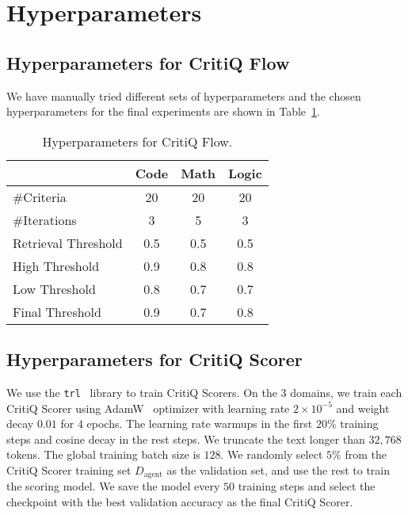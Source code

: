 \section{Hyperparameters}
\label{sec:hyperparameter}

\subsection{Hyperparameters for CritiQ Flow}

We have manually tried different sets of hyperparameters and the chosen
hyperparameters for the final experiments are shown in Table~\ref{tab:hyperparameter}.

\begin{table}[htbp]
    \centering
    \begin{tabular}{lccc}
        \toprule            & \textbf{Code} & \textbf{Math} & \textbf{Logic} \\
        \midrule \#Criteria & 20            & 20            & 20             \\
        \#Iterations        & 3             & 5             & 3              \\
        Retrieval Threshold & 0.5           & 0.5           & 0.5            \\
        High Threshold      & 0.9           & 0.8           & 0.8            \\
        Low Threshold       & 0.8           & 0.7           & 0.7            \\
        Final Threshold     & 0.9           & 0.7           & 0.8            \\
        \bottomrule
    \end{tabular}
    \caption{Hyperparameters for CritiQ Flow.}
    \label{tab:hyperparameter}
\end{table}

\subsection{Hyperparameters for CritiQ Scorer}

We use the \texttt{trl}~\citep{vonwerra2022trl} library to train CritiQ Scorers. On the 3 domains, we train each CritiQ Scorer using AdamW~\citep{loshchilov_decoupled_2019}
optimizer with learning rate $2 \times 10^{-5}$ and weight decay $0.01$ for $4$
epochs. The learning rate warmups in the first $20\%$ training steps and cosine decay
in the rest steps. We truncate the text longer than $32,768$ tokens. The global training
batch size is $128$. We randomly select $5\%$ from the CritiQ Scorer training
set $D_{\text{agent}}$ as the validation set, and use the rest to train the scoring
model. We save the model every $50$ training steps and select the checkpoint
with the best validation accuracy as the final CritiQ Scorer.

